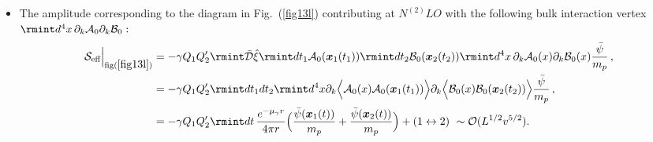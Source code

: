 \begin{itemize}


\item  The amplitude corresponding to the diagram in Fig.~(\ref{fig13l}) contributing at $N^{(2)}LO$ with the following bulk interaction vertex $\rmint d^4x\,\partial_k \mathcal{A}_0\partial_k \mathcal{B}_0 :$ 
\vspace{-0.5cm}
 \begin{align}
    \begin{split}
\mathcal{S}_{\text{eff}}\Big|_{\text{fig}(\ref{fig13l})}&=-\gamma Q_1 Q_2'\rmint \Bar{\mathcal{D}}\hat{\xi}\rmint dt_1\mathcal{A}_0(\boldsymbol{x}_1(t_1))\rmint dt_2\mathcal{B}_0(\boldsymbol{x}_2(t_2))\rmint d^4x\,\partial_k\mathcal{A}_0(x)\partial_k\mathcal{B}_0(x)\frac{\Bar{\psi}}{m_p}\,,\\&=-\gamma Q_1 Q_2'\rmint dt_1dt_2\rmint d^4x\partial_k\Big{\langle}\mathcal{A}_0(x)\mathcal{A}_0(\boldsymbol{x}_1(t_1))\Big{\rangle}\partial_k\Big{\langle}\mathcal{B}_0(x)\mathcal{B}_0(\boldsymbol{x}_2(t_2))\Big{\rangle}\frac{\Bar{\psi}}{m_p}\,,\\ &
=-\gamma Q_1Q_2'\rmint dt\,\frac{e^{-\mu_{\gamma}r}}{4\pi r}\Big(\frac{\Bar{\psi}(\boldsymbol{x}_1(t))}{m_p}+\frac{\Bar{\psi}(\boldsymbol{x}_2(t))}{m_p}\Big)+(1\leftrightarrow 2)\,\,\sim \mathcal{O}(L^{1/2}v^{5/2}).

\end{split}
\end{align}
\end{itemize}
